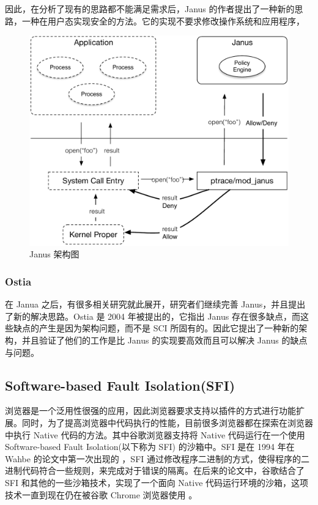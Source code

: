 \documentclass[final,12pt]{elsarticle}
\begin{document}
因此，在分析了现有的思路都不能满足需求后，Janus 的作者提出了一种新的思路，一种在用户态实现安全的方法。它的实现不要求修改操作系统和应用程序，

\begin{figure}
\centering
\label{fig:janus}
\includegraphics[width=0.7\linewidth]{imgs/janus}
\caption{Janus 架构图}
\end{figure}

\subsubsection{Ostia}
\label{sss:ostia}

在 Janua 之后，有很多相关研究就此展开，研究者们继续完善 Janus，并且提出了新的解决思路。Ostia \cite{garfinkel} 是 2004 年被提出的，它指出 Janus 存在很多缺点，而这些缺点的产生是因为架构问题，而不是 SCI 所固有的。因此它提出了一种新的架构，并且验证了他们的工作是比 Janus 的实现要高效而且可以解决 Janus 的缺点与问题。

\subsection{Software-based Fault Isolation(SFI)}
\label{ss:sfi}

浏览器是一个泛用性很强的应用，因此浏览器要求支持以插件的方式进行功能扩展。同时，为了提高浏览器中代码执行的性能，目前很多浏览器都在探索在浏览器中执行 Native 代码的方法。其中谷歌浏览器支持将 Native 代码运行在一个使用 Software-based Fault Isolation(以下称为 SFI) 的沙箱中。SFI 是在 1994 年在 Wahbe 的论文中第一次出现的 \cite{wahbe1994efficient}，SFI 通过修改程序二进制的方式，使得程序的二进制代码符合一些规则，来完成对于错误的隔离。在后来的论文中，谷歌结合了 SFI 和其他的一些沙箱技术，实现了一个面向 Native 代码运行环境的沙箱，这项技术一直到现在仍在被谷歌 Chrome 浏览器使用 \cite{nacl}。
\end{document}
